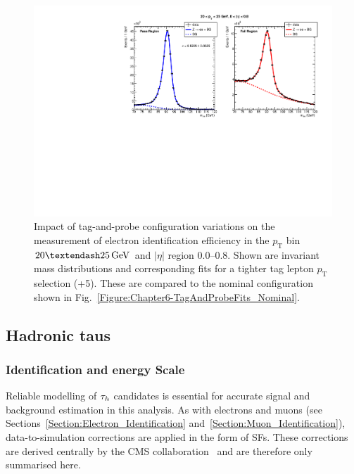 \begin{figure}[!htbp]
    \centering
    \includegraphics[width=\textwidth]{Figures/Chapter6/data_id_pt_20_to_25_eta_0.0_to_0.8_tpzee_tightTag.pdf}
    \caption[Impact of tag-and-probe configuration variations on efficiency extraction.]{Impact of tag-and-probe configuration variations on the measurement of electron identification efficiency in the $p_{\mathrm{T}}$ bin $20–25\GeV$ and $|\eta|$ region 0.0–0.8. Shown are invariant mass distributions and corresponding fits for a tighter tag lepton $p_\text{T}$ selection (+5\GeV). These are compared to the nominal configuration shown in Fig.~\ref{Figure:Chapter6-TagAndProbeFits_Nominal}.}
    \label{Figure:Chapter6-TagAndProbeFits_Alternative}
\end{figure}

\subsection{Hadronic taus}

\subsubsection{Identification and energy Scale}
\label{Section:Chapter6_Tau_ID_ES}

Reliable modelling of $\tau_h$ candidates is essential for accurate signal and background estimation in this analysis. As with electrons and muons (see Sections~\ref{Section:Electron_Identification} and~\ref{Section:Muon_Identification}), data-to-simulation corrections are applied in the form of SFs. These corrections are derived centrally by the \ac{CMS} collaboration~\cite{DeepTau_24-001} and are therefore only summarised here.

